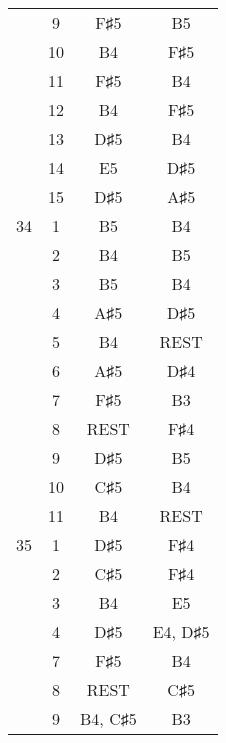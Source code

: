 \documentclass{article}
\begin{document}
\begin{longtable}{|c|c|c|c|}
  & 9 & F♯5 & B5 \\ 
  & 10 & B4 & F♯5 \\ 
  & 11 & F♯5 & B4 \\ 
  & 12 & B4 & F♯5 \\ 
  & 13 & D♯5 & B4 \\ 
  & 14 & E5 & D♯5 \\ 
  & 15 & D♯5 & A♯5 \\ 
\hline
34 & 1 & B5 & B4 \\ 
  & 2 & B4 & B5 \\ 
  & 3 & B5 & B4 \\ 
  & 4 & A♯5 & D♯5 \\ 
  & 5 & B4 & REST \\ 
  & 6 & A♯5 & D♯4 \\ 
  & 7 & F♯5 & B3 \\ 
  & 8 & REST & F♯4 \\ 
  & 9 & D♯5 & B5 \\ 
  & 10 & C♯5 & B4 \\ 
  & 11 & B4 & REST \\ 
\hline
35 & 1 & D♯5 & F♯4 \\ 
  & 2 & C♯5 & F♯4 \\ 
  & 3 & B4 & E5 \\ 
  & 4 & D♯5 & E4, D♯5 \\ 
  & 7 & F♯5 & B4 \\ 
  & 8 & REST & C♯5 \\ 
  & 9 & B4, C♯5 & B3 \\ 
\hline
\end{longtable}
\end{document}
